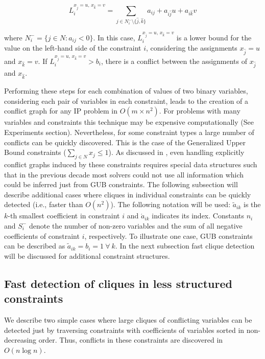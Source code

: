\documentclass{endm}
\begin{document}
\begin{equation}\label{li}
L_{i}^{x_{\hat{j}} = u,\, x_{\hat{k}} = v}=\sum_{j\in N_{i}^{-} \setminus \{\hat{j}, \hat{k}\}}a_{ij}+a_{i\hat{j}}u+a_{i\hat{k}}v 
\end{equation}

\noindent where $N_{i}^{-} = \{j \in N : a_{ij} < 0\}$. In this case, $L_{i}^{x_{\hat{j}} = u,\, x_{\hat{k}} = v}$ is a lower bound for the value on the left-hand side  of the constraint $i$, considering the assignments $x_{\hat{j}} = u$ and $x_{\hat{k}} = v$. If $L_{i}^{x_{\hat{j}} = u,\, x_{\hat{k}} = v} > b_{i}$, there is a conflict between the assignments of $x_{\hat{j}}$ and $x_{\hat{k}}$. 

Performing these steps for each combination of values of two binary variables, considering each pair of variables in each constraint, leads to the creation of a conflict graph for any IP problem in $O(m \times n^2)$. For problems with many variables and constraints this technique may be expensive computationally (See Experiments section). Nevertheless, for some constraint types a large number of conflicts can be quickly discovered. This is the case of the Generalized Upper Bound constraints ($\sum_{j\in N}x_j \leq 1$). As discussed in \cite{atamturk}, even handling explicitly conflict graphs induced by these constraints requires special data structures such that in the previous decade most solvers could not use all information which could be inferred just from GUB constraints. The following subsection will describe additional cases where cliques in individual constraints can be quickly detected (i.e., faster than $O(n^2)$). The following notation will be used: $\tilde{a}_{ik}$ is the $k$-th smallest coefficient in constraint $i$ and $\acute{a}_{ik}$ indicates its index. Constants $n_i$ and $S_i^-$ denote the number of non-zero variables and the sum of all negative coefficients of constraint $i$, respectively. To illustrate one case, GUB constraints can be described as $\tilde{a}_{ik}=b_i=1 \ \forall \ k$. In the next subsection fast clique detection will be discussed for additional constraint structures.


\subsection{Fast detection of cliques in less structured constraints}

We describe two simple cases where large cliques of conflicting variables can be detected just by traversing constraints with  coefficients of variables sorted in non-decreasing order. Thus, conflicts in these constraints are discovered in $O( n \log n)$.
\end{document}
